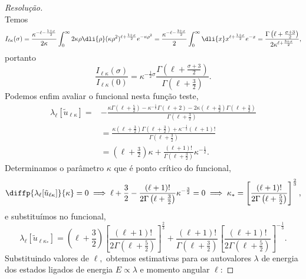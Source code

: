 \begin{proof}[Resolução]
\begin{equation*}
   \end{equation*}
   Temos
   \begin{equation*}
      I_{\ell \kappa}(\sigma) = \frac{\kappa^{-\ell - \frac{1 + \sigma}{2}}}{2\kappa}\int_0^\infty 2\kappa\rho\dli{\rho} (\kappa\rho^2)^{\ell + \frac{1 + \sigma}{2}} e^{- \kappa \rho^2} 
      = \frac{\kappa^{-\ell - \frac{3 + \sigma}{2}}}{2} \int_0^\infty \dli{x} x^{\ell + \frac{1 + \sigma}{2}} e^{-x} 
      = \frac{\Gamma\left(\ell + \frac{\sigma + 3}{2}\right)}{2\kappa^{\ell + \frac{3 + \sigma}{2}}},
   \end{equation*}
   portanto
   \begin{equation*}
      \frac{I_{\ell \kappa}(\sigma)}{I_{\ell \kappa}(0)} = \kappa^{-\frac12 \sigma}\frac{\Gamma\left(\ell + \frac{\sigma + 3}{2}\right)}{\Gamma\left(\ell + \frac32\right)}.
   \end{equation*}
   Podemos enfim avaliar o funcional nesta função teste,
   \begin{align*}
      \lambda_{\ell}[\tilde{u}_{\ell \kappa}] = &-\frac{\kappa \Gamma\left(\ell + \frac{5}{2}\right) - \kappa^{-\frac12} \Gamma(\ell + 2) - 2\kappa\left(\ell + \frac{3}{2}\right) \Gamma\left(\ell + \frac{3}{2}\right)}{\Gamma\left(\ell + \frac{3}{2}\right)}\\
      &= \frac{\kappa \left(\ell + \frac32\right) \Gamma\left(\ell + \frac32\right) + \kappa^{-\frac12} (\ell + 1)!}{\Gamma\left(\ell + \frac32\right)}\\
      &= \left(\ell + \frac32\right)\kappa + \frac{(\ell + 1)!}{\Gamma\left(\ell + \frac32\right)} \kappa^{-\frac12}.
   \end{align*}
   Determinamos o parâmetro \(\kappa\) que é ponto crítico do funcional,
   \begin{equation*}
      \diffp{\lambda_\ell[\tilde{u}_{\ell \kappa}]}{\kappa} = 0 \implies \ell + \frac32 - \frac{(\ell + 1)!}{2 \Gamma\left(\ell + \frac32\right)} \kappa^{-\frac32} = 0 \implies \kappa_* = \left[\frac{(\ell + 1)!}{2 \Gamma\left(\ell + \frac52\right)}\right]^{\frac23},
   \end{equation*}
   e substituímos no funcional,
   \begin{equation*}
      \lambda_{\ell}[\tilde{u}_{\ell \kappa_*}] = \left(\ell + \frac32\right)\left[\frac{(\ell + 1)!}{2 \Gamma\left(\ell + \frac52\right)}\right]^{\frac23} + \frac{(\ell + 1)!}{\Gamma\left(\ell + \frac32\right)}\left[\frac{(\ell + 1)!}{2 \Gamma\left(\ell + \frac52\right)}\right]^{-\frac13}.
   \end{equation*}
   Substituindo valores de \(\ell,\) obtemos estimativas para os autovalores \(\lambda\) de energia dos estados ligados de energia \(E \propto \lambda\) e momento angular \(\ell\):

\end{proof}
